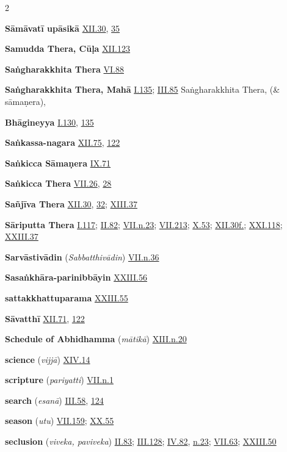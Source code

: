 \begin{multicols}{2}
\begin{vismHanging}
\par\textbf{Sāmāvatī upāsikā} \hyperlink{XII.30}{XII.30}{}, \hyperlink{XII.35}{35}{}
\par\textbf{Samudda Thera, Cūḷa} \hyperlink{XII.123}{XII.123}{}
\par\textbf{Saṅgharakkhita Thera} \hyperlink{VI.88}{VI.88}{}
\par\textbf{Saṅgharakkhita Thera, Mahā} \hyperlink{I.135}{I.135}{}; \hyperlink{III.85}{III.85}{} Saṅgharakkhita Thera, (\& sāmaṇera),
\par\textbf{Bhāgineyya} \hyperlink{I.130}{I.130}{}, \hyperlink{I.135}{135}{}
\par\textbf{Saṅkassa-nagara} \hyperlink{XII.75}{XII.75}{}, \hyperlink{XII.122}{122}{}
\par\textbf{Saṅkicca Sāmaṇera} \hyperlink{IX.71}{IX.71}{}
\par\textbf{Saṅkicca Thera} \hyperlink{VII.26}{VII.26}{}, \hyperlink{VII.28}{28}{}
\par\textbf{Sañjīva Thera} \hyperlink{XII.30}{XII.30}{}, \hyperlink{XII.32}{32}{}; \hyperlink{XIII.37}{XIII.37}{}
\par\textbf{Sāriputta Thera} \hyperlink{I.117}{I.117}{}; \hyperlink{II.82}{II.82}{}; \hyperlink{VII.n23}{VII.n.23}{}; \hyperlink{VII.213}{VII.213}{}; \hyperlink{X.53}{X.53}{}; \hyperlink{XII.30}{XII.30f.}{}; \hyperlink{XXI.118}{XXI.118}{}; \hyperlink{XXIII.37}{XXIII.37}{}
\par\textbf{Sarvāstivādin} (\emph{Sabbatthivādin}) \hyperlink{VII.n36}{VII.n.36}{}
\par\textbf{Sasaṅkhāra-parinibbāyin} \hyperlink{XXIII.56}{XXIII.56}{}
\par\textbf{sattakkhattuparama} \hyperlink{XXIII.55}{XXIII.55}{}
\par\textbf{Sāvatthī} \hyperlink{XII.71}{XII.71}{}, \hyperlink{XII.122}{122}{}
\par\textbf{Schedule of Abhidhamma} (\emph{mātikā}) \hyperlink{XIII.n20}{XIII.n.20}{}
\par\textbf{science} (\emph{vijjā}) \hyperlink{XIV.14}{XIV.14}{}
\par\textbf{scripture} (\emph{pariyatti}) \hyperlink{VII.n1}{VII.n.1}{}
\par\textbf{search} (\emph{esanā}) \hyperlink{III.58}{III.58}{}, \hyperlink{III.124}{124}{}
\par\textbf{season} (\emph{utu}) \hyperlink{VII.159}{VII.159}{}; \hyperlink{XX.55}{XX.55}{}
\par\textbf{seclusion} (\emph{viveka, paviveka}) \hyperlink{II.83}{II.83}{}; \hyperlink{III.128}{III.128}{}; \hyperlink{IV.82}{IV.82}{}, \hyperlink{IV.n23}{n.23}{}; \hyperlink{VII.63}{VII.63}{}; \hyperlink{XXIII.50}{XXIII.50}{}

\end{vismHanging}
\end{multicols}
